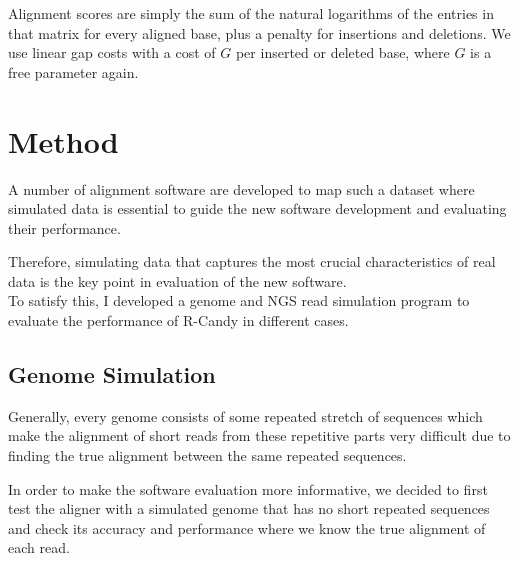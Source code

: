 \documentclass[11pt,a4paper]{report}
\begin{document}
Alignment scores are simply the sum of the natural logarithms of the
entries in that matrix for every aligned base, plus a penalty for
insertions and deletions.  We use linear gap costs with a cost of $G$
per inserted or deleted base, where $G$ is a free parameter again.













\section{Method} \label{Method}
A number of alignment software are developed to map such a dataset where 
simulated data is essential to guide the new software development and 
evaluating their performance.

Therefore, simulating data that captures the most crucial characteristics 
of real data is the key point in evaluation of the new software.\\

To satisfy this, I developed a genome and NGS read simulation program to evaluate 
the performance of R-Candy in different cases.





\subsection{Genome Simulation} 
\label{ Genome Simulation }

Generally, every genome consists of some repeated stretch of sequences which make 
the alignment of short reads from these repetitive parts very difficult due to 
finding the true alignment between the same repeated sequences.

In order to make the software evaluation more informative, we decided to first 
test the aligner with a simulated genome that has no short repeated sequences 
and check its accuracy and performance where we know the true alignment of each 
read.
\end{document}
